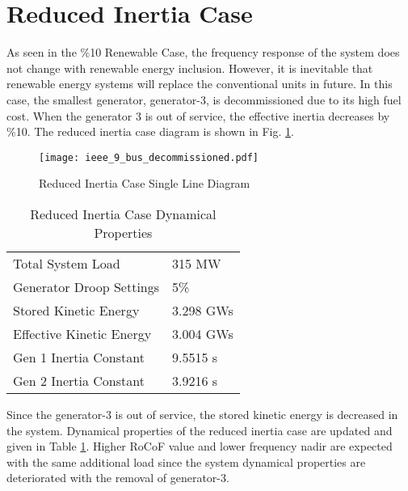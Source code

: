 \section{Reduced Inertia Case}
\label{sec:kdecommissioned}
As seen in the \%10 Renewable Case, the frequency response of the system does not change with renewable energy inclusion. However, it is inevitable that renewable energy systems will replace the conventional units in future. In this case, the smallest generator, generator-3, is decommissioned due to its high fuel cost. When the generator 3 is out of service, the effective inertia decreases by \%10. The reduced inertia case diagram is shown in Fig. \ref{decommissioned_case}.\par
\begin{figure}[h!]
	\centering
	\texttt{[image: ieee\_9\_bus\_decommissioned.pdf]}
	\caption{Reduced Inertia Case Single Line Diagram}
	\label{decommissioned_case}
\end{figure}
\begin{table}[h]
	\centering
	\begin{tabular}{ll}
		\hline
		Total System Load                      & 315 MW    \\
		Generator Droop Settings               & 5\%       \\
		Stored Kinetic Energy 				   & 3.298 GWs \\
		Effective Kinetic Energy 			   & 3.004 GWs \\
		Gen 1 Inertia Constant                 & 9.5515 s  \\
		Gen 2 Inertia Constant                 & 3.9216 s  \\
		\hline
	\end{tabular}
	\caption{Reduced Inertia Case Dynamical Properties}
	\label{systemdynamicaldatacase3}
\end{table}
Since the generator-3 is out of service, the stored kinetic energy is decreased in the system. Dynamical properties of the reduced inertia case are updated and given in Table \ref{systemdynamicaldatacase3}. Higher RoCoF value and lower frequency nadir are expected with the same additional load since the system dynamical properties are deteriorated with the removal of generator-3.

